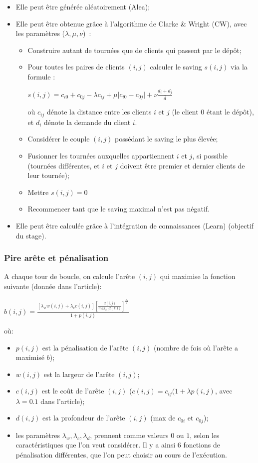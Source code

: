 \documentclass[a4paper,11pt]{article}%
\begin{document}
\begin{itemize}
\item Elle peut être générée aléatoirement (Alea);
\item Elle peut être obtenue grâce à l'algorithme de Clarke \& Wright (CW), avec les paramètres ($\lambda,\mu,\nu$)~\cite{Altinel_2005}: 
\begin{itemize}
\item Construire autant de tournées que de clients qui passent par le dépôt;
\item Pour toutes les paires de clients $(i,j)$ calculer le saving $s(i,j)$ via la formule : 
\begin{center}
$s(i,j) = c_{i0} + c_{0j} - \lambda c_{ij} + \mu \vert c_{i0} - c_{0j} \vert + \nu \frac{d_i + d_j}{\overline{d}}$
\end{center}
où $c_{ij}$ dénote la distance entre les clients $i$ et $j$ (le client 0 étant le dépôt), et $d_i$ dénote la demande du client $i$.
\item Considérer le couple $(i,j)$ possédant le saving le plus élevée;
\item Fusionner les tournées auxquelles appartiennent $i$ et $j$, si possible (tournées différentes, et $i$ et $j$ doivent être premier et dernier clients de leur tournée);
\item Mettre $s(i,j) = 0$
\item Recommencer tant que le saving maximal n'est pas négatif.
\end{itemize}
\item Elle peut être calculée grâce à l'intégration de connaissances (Learn) (objectif du stage).
\end{itemize}


\subsubsection{Pire arête et pénalisation}
A chaque tour de boucle, on calcule l'arête $(i,j)$ qui maximise la fonction suivante (donnée dans l'article):
\begin{center}
$b(i,j) = \frac{[\lambda_w w(i,j) + \lambda_c c(i,j)] [\frac{d(i,j)}{max_{k,l}d(k,l)}] ^ {\frac{\lambda_d}{2}}}{1+p(i,j)}$
\end{center}
où:
\begin{itemize}
\item $p(i,j)$ est la pénalisation de l'arête $(i,j)$ (nombre de fois où l'arête a maximisé $b$);
\item $w(i,j)$ est la largeur de l'arête $(i,j)$;
\item $c(i,j)$ est le coût de l'arête $(i,j)$ ($c(i,j) = c_{ij}(1 + \lambda p(i,j)$, avec $\lambda = 0.1$ dans l'article);
\item $d(i,j)$ est la profondeur de l'arête $(i,j)$ (max de $c_{0i}$ et $c_{0j}$);
\item les paramètres $\lambda_w,\lambda_c,\lambda_d$, prennent comme valeurs $0$ ou $1$, selon les caractéristiques que l'on veut considérer. Il y a ainsi 6 fonctions de pénalisation différentes, que l'on peut choisir au cours de l'exécution.

\end{itemize}
\end{document}
